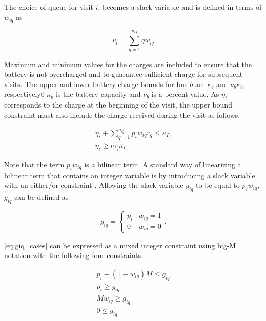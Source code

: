 The choice of queue for visit $i$, becomes a slack variable and is defined in terms of $w_{iq}$ as

\begin{equation}
    v_i = \sum_{q=1}^{n_Q} qw_{iq}
\end{equation}

Maximum and minimum values for the charges are included to ensure that the battery is not overcharged and to guarantee
sufficient charge for subsequent visits. The upper and lower battery charge bounds for bus $b$ are $\kappa_b$ and $\nu_b \kappa_b$,
respectively0 $\kappa_b$ is the battery capacity and $\nu_b$ is a percent value. As $\eta_i$ corresponds to the charge at the
beginning of the visit, the upper bound constraint must also include the charge received during the visit as follows.

\begin{subequations}
    \label{subeq:pre_min_max}
\begin{align}
    \eta_i + \sum_{q=1}^{n_Q} p_i w_{iq} r_q \leq \kappa_{\Gamma_i}                 \\
    \eta_i \geq \nu_{\Gamma_i} \kappa_{\Gamma_i}
\end{align}
\end{subequations}

Note that the term $p_i w_{iq}$ is a bilinear term. A standard way of linearizing a bilinear term that contains an
integer variable is by introducing a slack variable with an either/or constraint \cite{Chen2010,Rodriguez2013}. Allowing
the slack variable $g_{iq}$ to be equal to $p_i w_{iq}$, $g_{iq}$ can be defined as

\begin{equation}
    \label{eq:giq_cases}
    g_{iq} =
    \begin{cases}
        p_i & w_{iq} = 1 \\
        0 & w_{iq} = 0
    \end{cases}.
\end{equation}

\autoref{eq:giq_cases} can be expressed as a mixed integer constraint using big-M notation with the following four
constraints.

\begin{subequations}
    \label{eq:slack_gain}
\begin{align}
    p_i - (1 - w_{iq})M \leq g_{iq}  \label{subeq:repgpgret} \\
    p_i \geq g_{iq}                 \label{subeq:repgples} \\
    Mw_{iq} \geq g_{iq}              \label{subeq:repgwgret} \\
    0 \leq g_{iq}                   \label{subeq:repgwles}
\end{align}
\end{subequations}

